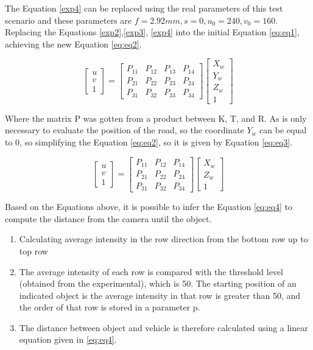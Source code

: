 The Equation \ref{exp4} can be replaced using the real parameters of this test scenario and these parameters are $f = 2.92 mm, s=0, u_0=240, v_0=160$. Replacing the Equations \ref{exp2},\ref{exp3}, \ref{exp4} into the initial Equation \ref{eq:eq1}, achieving the new Equation \ref{eq:eq2}.

\begin{equation}
    \begin{bmatrix}
u\\ 
v\\ 
1
\end{bmatrix}
=\begin{bmatrix}
P_{11} & P_{12} & P_{13} & P_{14}\\ 
P_{21} & P_{22} & P_{23} & P_{24}\\ 
P_{31} & P_{32} & P_{33} & P_{34}
\end{bmatrix}
\begin{bmatrix}
X_w\\ 
Y_w\\ 
Z_w\\
1
\end{bmatrix}
\label{eq:eq2}
\end{equation}

Where the matrix P was gotten from a product between K, T, and R. As is only necessary to evaluate the position of the road, so the coordinate $Y_w$ can be equal to 0, so simplifying the Equation \ref{eq:eq2}, so it is given by Equation \ref{eq:eq3}.

\begin{equation}
    \label{eq:eq3}
    \begin{bmatrix}
u\\ 
v\\ 
1
\end{bmatrix}
=\begin{bmatrix}
P_{11} & P_{12}  & P_{14}\\ 
P_{21} & P_{22}  & P_{24}\\ 
P_{31} & P_{32}  & P_{34}
\end{bmatrix}
\begin{bmatrix}
X_w\\ 
Z_w\\
1
\end{bmatrix}
\end{equation}

Based on the Equations above, it is possible to infer the Equation \ref{eq:eq4} to compute the distance from the camera until the object. 

\begin{enumerate}
    \item Calculating average intensity in the row direction from the bottom row up to top row
    \item The average intensity of each row is compared with the threshold level (obtained from the experimental), which is 50. The starting position of an indicated object is the average intensity in that row is greater than 50, and the order of that row is stored in a parameter p.
    \item The distance between object and vehicle is therefore calculated using a linear equation given in \ref{eq:eq4}.
\end{enumerate}

